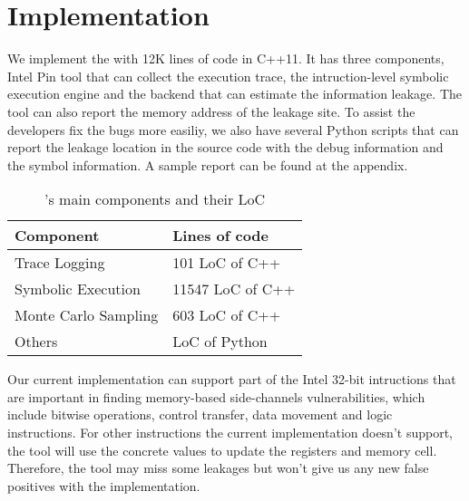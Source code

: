 \section{Implementation}
We implement the \tool{} with 12K lines of code in C++11. It has three components, Intel
Pin tool that can collect the execution trace, the intruction-level symbolic execution
engine and the backend that can estimate the information leakage. The tool can also report 
the memory address of the leakage site. To assist the developers fix the bugs more easiliy,
we also have several Python scripts that can report the leakage location in the source code 
with the debug information and the symbol information. A sample report can be found at the 
appendix.

\begin{table}[h]
    \centering
    \begin{tabular}{ll}
    \hline
    Component                            & Lines of code    \\ \hline
    Trace Logging                        & 101 LoC of C++   \\ 
    Symbolic Execution & 11547 LoC of C++ \\ 
    Monte Carlo Sampling                 & 603 LoC of C++   \\ 
    Others                               & LoC of Python    \\ \hline
    \end{tabular}
    \caption{\tool{}'s main components and their LoC}
\end{table}

Our current implementation can support part of the Intel 32-bit intructions that are important 
in finding memory-based side-channels vulnerabilities, which include bitwise operations, 
control transfer, data movement and logic instructions. For other 
instructions the current implementation doesn't support, 
the tool will use the concrete values to update the registers and memory cell.
Therefore, the tool may miss some leakages but won't give us any new false positives with the
implementation.